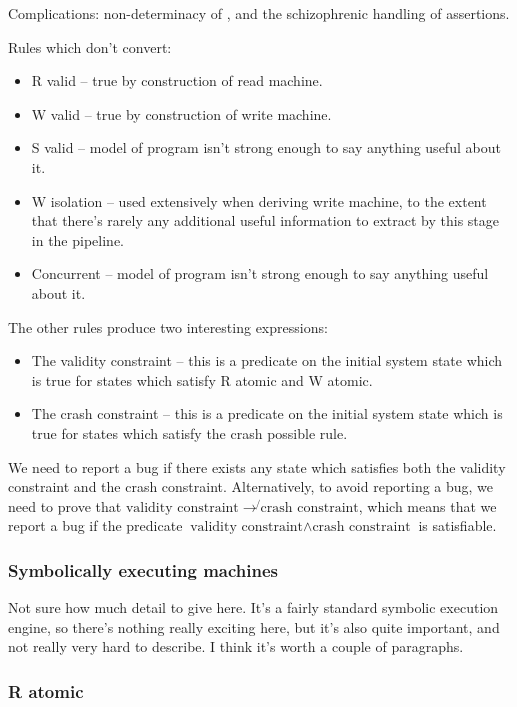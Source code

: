 \documentclass[12pt,a4paper]{book}
\begin{document}
Complications: non-determinacy of \StateMachines, and the schizophrenic handling of assertions.

Rules which don't convert:

\begin{itemize}
\item R valid -- true by construction of read machine.
\item W valid -- true by construction of write machine.
\item S valid -- model of program isn't strong enough to say anything useful about it.
\item W isolation -- used extensively when deriving write machine, to
  the extent that there's rarely any additional useful information to
  extract by this stage in the pipeline.
\item Concurrent -- model of program isn't strong enough to say anything useful about it.
\end{itemize}

The other rules produce two interesting expressions:

\begin{itemize}
\item The validity constraint -- this is a predicate on the initial system state which is true for states which satisfy R atomic and W atomic.
\item The crash constraint -- this is a predicate on the initial system state which is true for states which satisfy the crash possible rule.
\end{itemize}

We need to report a bug if there exists any state which satisfies both the validity constraint and the crash constraint.
Alternatively, to avoid reporting a bug, we need to prove that $\textrm{validity constraint} \rightarrow \not{}\textrm{crash constraint}$, which means that we report a bug if the predicate $\textrm{validity constraint} \wedge \textrm{crash constraint}$ is satisfiable.

\subsubsection{Symbolically executing machines}
Not sure how much detail to give here.
It's a fairly standard symbolic execution engine, so there's nothing really exciting here, but it's also quite important, and not really very hard to describe.
I think it's worth a couple of paragraphs.

\subsubsection{R atomic}
\end{document}
